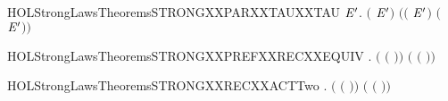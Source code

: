 \begin{SaveVerbatim}{HOLStrongLawsTheoremsSTRONGXXPARXXTAUXXTAU}
\HOLTokenTurnstile{} \HOLSymConst{\HOLTokenForall{}} \ensuremath{\HOLBoundVar{E}\sp{\prime}}.
        \ensuremath{(}\HOLConst{\ensuremath{\tau}}\HOLSymConst{\ensuremath{\ldotp}} \HOLSymConst{\ensuremath{\mid}} \HOLConst{\ensuremath{\tau}}\HOLSymConst{\ensuremath{\ldotp}}\ensuremath{\HOLBoundVar{E}\sp{\prime}}\ensuremath{)} \ensuremath{(}\HOLConst{\ensuremath{\tau}}\HOLSymConst{\ensuremath{\ldotp}}\ensuremath{(} \HOLSymConst{\ensuremath{\mid}} \HOLConst{\ensuremath{\tau}}\HOLSymConst{\ensuremath{\ldotp}}\ensuremath{\HOLBoundVar{E}\sp{\prime}}\ensuremath{)} \HOLSymConst{\ensuremath{+}} \HOLConst{\ensuremath{\tau}}\HOLSymConst{\ensuremath{\ldotp}}\ensuremath{(}\HOLConst{\ensuremath{\tau}}\HOLSymConst{\ensuremath{\ldotp}} \HOLSymConst{\ensuremath{\mid}} \ensuremath{\HOLBoundVar{E}\sp{\prime}}\ensuremath{)}\ensuremath{)}
\end{SaveVerbatim}
\newcommand{\HOLStrongLawsTheoremsSTRONGXXPARXXTAUXXTAU}{\UseVerbatim{HOLStrongLawsTheoremsSTRONGXXPARXXTAUXXTAU}}
\begin{SaveVerbatim}{HOLStrongLawsTheoremsSTRONGXXPREFXXRECXXEQUIV}
\HOLTokenTurnstile{} \HOLSymConst{\HOLTokenForall{}}  .
        \ensuremath{(}\HOLSymConst{\ensuremath{\ldotp}}  \ensuremath{(}\HOLSymConst{\ensuremath{\ldotp}}\HOLSymConst{\ensuremath{\ldotp}} \ensuremath{)}\ensuremath{)} \ensuremath{(}  \ensuremath{(}\HOLSymConst{\ensuremath{\ldotp}}\HOLSymConst{\ensuremath{\ldotp}} \ensuremath{)}\ensuremath{)}
\end{SaveVerbatim}
\newcommand{\HOLStrongLawsTheoremsSTRONGXXPREFXXRECXXEQUIV}{\UseVerbatim{HOLStrongLawsTheoremsSTRONGXXPREFXXRECXXEQUIV}}
\begin{SaveVerbatim}{HOLStrongLawsTheoremsSTRONGXXRECXXACTTwo}
\HOLTokenTurnstile{} \HOLSymConst{\HOLTokenForall{}} .  \ensuremath{(}  \ensuremath{(}\HOLSymConst{\ensuremath{\ldotp}}\HOLSymConst{\ensuremath{\ldotp}} \ensuremath{)}\ensuremath{)} \ensuremath{(}  \ensuremath{(}\HOLSymConst{\ensuremath{\ldotp}} \ensuremath{)}\ensuremath{)}
\end{SaveVerbatim}
